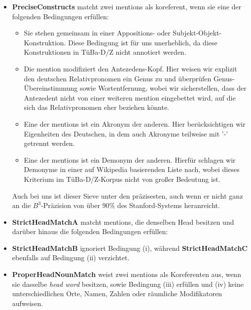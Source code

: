 \documentclass{scrartcl}
\begin{document}
\begin{itemize}
\item \textbf{PreciseConstructs} matcht zwei mentions als koreferent, wenn sie eine der folgenden Bedingungen erfüllen: 
\begin{itemize}
	\item Sie stehen gemeinsam in einer Appositions- oder Subjekt-Objekt-Konstruktion. Diese Bedingung ist für uns unerheblich, da diese Konstruktionen in TüBa-D/Z nicht annotiert werden.
	\item Die mention modifiziert den Antezedens-Kopf. Hier weisen wir explizit den deutschen Relativpronomen ein Genus zu und überprüfen Genus-Übereinstimmung sowie Wortentfernung, wobei wir sicherstellen, dass der Antezedent nicht von einer weiteren mention eingebettet wird, auf die sich das Relativpronomen eher beziehen könnte.
	\item Eine der mentions ist ein Akronym der anderen. Hier berücksichtigen wir Eigenheiten des Deutschen, in dem auch Akronyme teilweise mit '-' getrennt werden.
	\item Eine der mentions ist ein Demonym der anderen. Hierfür schlagen wir Demonyme in einer auf Wikipedia basierenden Liste nach, wobei dieses Kriterium im TüBa-D/Z-Korpus nicht von großer Bedeutung ist.
\end{itemize}
Auch bei uns ist dieser Sieve unter den präzisesten, auch wenn er nicht ganz an die $B^3$-Präzision von über 90\% des Stanford-Systems heranreicht.

\item \textbf{StrictHeadMatchA} matcht mentions, die denselben Head besitzen und darüber hinaus die folgenden Bedingungen erfüllen:


\item \textbf{StrictHeadMatchB} ignoriert Bedingung (i), während \textbf{StrictHeadMatchC} ebenfalls auf Bedingung (ii) verzichtet.

\item \textbf{ProperHeadNounMatch} weist zwei mentions als Koreferenten aus, wenn sie dasselbe \textit{head word} besitzen, sowie Bedingung (iii) erfüllen und (iv) keine unterschiedlichen Orte, Namen, Zahlen oder räumliche Modifikatoren aufweisen.


\end{itemize}
\end{document}
